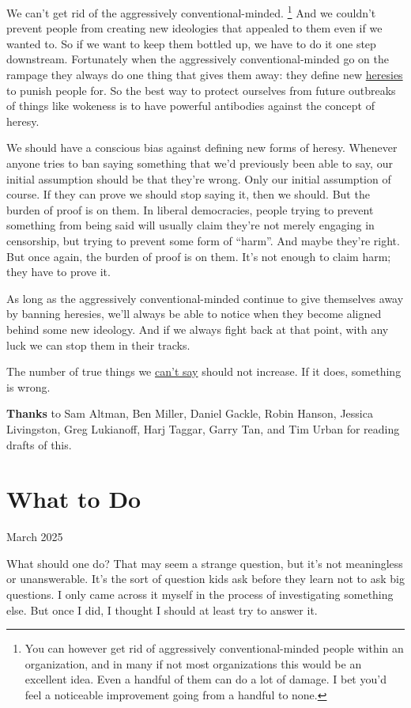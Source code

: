 \documentclass[12pt]{book}
\begin{document}
We can't get rid of the aggressively conventional-minded.
\footnote{You can however get rid of aggressively conventional-minded
people within an organization, and in many if not most organizations
this would be an excellent idea. Even a handful of them can do a lot of
damage. I bet you'd feel a noticeable improvement going from a handful
to none.} And we couldn't prevent people from creating
new ideologies that appealed to them even if we wanted to. So if we want
to keep them bottled up, we have to do it one step downstream.
Fortunately when the aggressively conventional-minded go on the rampage
they always do one thing that gives them away: they define new
\href{heresy.html}{heresies} to punish people for. So the best way to
protect ourselves from future outbreaks of things like wokeness is to
have powerful antibodies against the concept of heresy.

We should have a conscious bias against defining new forms of heresy.
Whenever anyone tries to ban saying something that we'd previously been
able to say, our initial assumption should be that they're wrong. Only
our initial assumption of course. If they can prove we should stop
saying it, then we should. But the burden of proof is on them. In
liberal democracies, people trying to prevent something from being said
will usually claim they're not merely engaging in censorship, but trying
to prevent some form of ``harm''. And maybe they're right. But once
again, the burden of proof is on them. It's not enough to claim harm;
they have to prove it.

As long as the aggressively conventional-minded continue to give
themselves away by banning heresies, we'll always be able to notice when
they become aligned behind some new ideology. And if we always fight
back at that point, with any luck we can stop them in their tracks.

The number of true things we \href{say.html}{can't say} should not
increase. If it does, something is wrong.


\textbf{Thanks} to Sam Altman, Ben Miller, Daniel Gackle, Robin Hanson,
Jessica Livingston, Greg Lukianoff, Harj Taggar, Garry Tan, and Tim
Urban for reading drafts of this.
\chapter{What to Do}

March 2025

What should one do? That may seem a strange question, but it's not
meaningless or unanswerable. It's the sort of question kids ask before
they learn not to ask big questions. I only came across it myself in the
process of investigating something else. But once I did, I thought I
should at least try to answer it.
\end{document}

